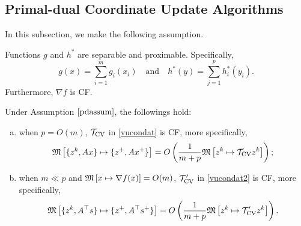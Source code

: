 {{\subsection{Primal-dual Coordinate Update Algorithms}\label{sec:pdcu}
In this subsection, we make the following assumption.
\begin{assumption}
Functions $g$ and $h^*$ are separable and proximable. Specifically, $$g(x)=\displaystyle\sum_{i=1} ^m g_i(x_i)\quad\mbox{and}\quad h^*(y)=\displaystyle\sum_{j=1}^ph^*_i(y_i).$$\label{pdassum}
Furthermore, $\nabla f$ is CF.
\end{assumption}
\begin{proposition}\DIFaddbegin \label{prop1}
\DIFaddend Under Assumption $\ref{pdassum}$, the followings hold:
\begin{enumerate}[(a)]
\item when $p=O(m)$, ${{\mathcal{T}}_{\textnormal{CV}}}$ in \eqref{vucondat} is CF, more specifically, $$\mathfrak{M}\left[{\{z^k,Ax\}}\mapsto {\{z^+,Ax^+\}}\right]=O\left(\frac{1}{m+p}\mathfrak{M}\left[{z^k}\mapsto {{{\mathcal{T}}_{\textnormal{CV}}}z^k}\right]\right);$$ 
\item when $m\ll p$ and $\mathfrak{M}\left[{x}\mapsto {\nabla f(x)}\right]=O(m)$, ${\mathcal{T}}'_\textnormal{CV}$ in \eqref{vucondat2} is CF, more specifically, $$\mathfrak{M}\left[{\{z^k,A^\top s\}}\mapsto {\{z^+,A^\top s^+\}}\right]=O\left(\frac{1}{m+p}\mathfrak{M}\left[{z^k}\mapsto {{\mathcal{T}}'_{\textnormal{CV}} z^k}\right]\right).$$
\end{enumerate}
\end{proposition}

}}
